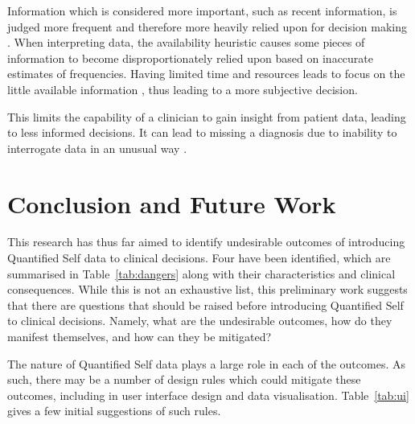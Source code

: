 \documentclass{chi-ext}
\begin{document}
  Information which is considered more important, such as recent information, is judged more frequent and therefore more heavily relied upon for decision making \cite{Kahneman2012}. When interpreting data, the availability heuristic causes some pieces of information to become disproportionately relied upon based on inaccurate estimates of frequencies. Having limited time and resources leads to focus on the little available information \cite{Croskerry2002}, thus leading to a more subjective decision.

  This limits the capability of a clinician to gain insight from patient data, leading to less informed decisions. It can lead to missing a diagnosis due to inability to interrogate data in an unusual way \cite{Croskerry2002}.




\section{Conclusion and Future Work}

\captionsetup{belowskip=0.2pt,aboveskip=0pt}


  This research has thus far aimed to identify undesirable outcomes of introducing Quantified Self data to clinical decisions. Four have been identified, which are summarised in Table~\ref{tab:dangers} along with their characteristics and clinical consequences. While this is not an exhaustive list, this preliminary work suggests that there are questions that should be raised before introducing Quantified Self to clinical decisions. Namely, what are the undesirable outcomes, how do they manifest themselves, and how can they be mitigated? 

  The nature of Quantified Self data plays a large role in each of the outcomes. As such, there may be a number of design rules which could mitigate these outcomes, including in user interface design and data visualisation. Table~\ref{tab:ui} gives a few initial suggestions of such rules.
\end{document}
